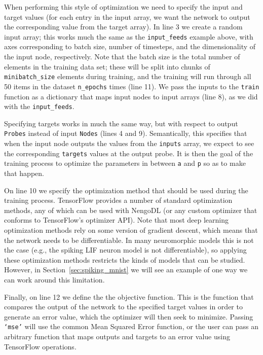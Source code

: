 \documentclass{article}
\begin{document}
\lstset{numbers=left}


When performing this style of optimization we need to specify the input and target values (for each entry in the input array, we want the network to output the corresponding value from the target array).  In line 3 we create a random input array; this works much the same as the \texttt{input\_feeds} example above, with axes corresponding to batch size, number of timesteps, and the dimensionality of the input node, respectively.  Note that the batch size is the total number of elements in the training data set; these will be split into chunks of \texttt{minibatch\_size} elements during training, and the training will run through all 50 items in the dataset \texttt{n\_epochs} times (line 11).  We pass the inputs to the \texttt{train} function as a dictionary that maps input nodes to input arrays (line 8), as we did with the \texttt{input\_feeds}.

Specifying targets works in much the same way, but with respect to output \texttt{Probes} instead of input \texttt{Nodes} (lines 4 and 9).  Semantically, this specifies that when the input node outputs the values from the \texttt{inputs} array, we expect to see the corresponding \texttt{targets} values at the output probe.  It is then the goal of the training process to optimize the parameters in between \texttt{a} and \texttt{p} so as to make that happen.

On line 10 we specify the optimization method that should be used during the training process.  TensorFlow provides a number of standard optimization methods, any of which can be used with NengoDL (or any custom optimizer that conforms to TensorFlow's optimizer API).  Note that most deep learning optimization methods rely on some version of gradient descent, which means that the network needs to be differentiable.  In many neuromorphic models this is not the case (e.g., the spiking LIF neuron model is not differentiable), so applying these optimization methods restricts the kinds of models that can be studied.  However, in Section~\ref{sec:spiking_mnist} we will see an example of one way we can work around this limitation.

Finally, on line 12 we define the the objective function.  This is the function that compares the output of the network to the specified target values in order to generate an error value, which the optimizer will then seek to minimize.  Passing \texttt{`mse'} will use the common Mean Squared Error function, or the user can pass an arbitrary function that maps outputs and targets to an error value using TensorFlow operations.
\end{document}
